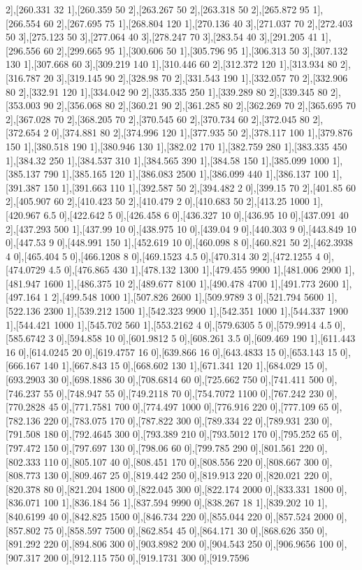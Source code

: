 {2],[260.331 32 1],[260.359 50 2],[263.267 50 2],[263.318 50 2],[265.872 95 1],[266.554 60 2],[267.695 75 1],[268.804 120 1],[270.136 40 3],[271.037 70 2],[272.403 50 3],[275.123 50 3],[277.064 40 3],[278.247 70 3],[283.54 40 3],[291.205 41 1],[296.556 60 2],[299.665 95 1],[300.606 50 1],[305.796 95 1],[306.313 50 3],[307.132 130 1],[307.668 60 3],[309.219 140 1],[310.446 60 2],[312.372 120 1],[313.934 80 2],[316.787 20 3],[319.145 90 2],[328.98 70 2],[331.543 190 1],[332.057 70 2],[332.906 80 2],[332.91 120 1],[334.042 90 2],[335.335 250 1],[339.289 80 2],[339.345 80 2],[353.003 90 2],[356.068 80 2],[360.21 90 2],[361.285 80 2],[362.269 70 2],[365.695 70 2],[367.028 70 2],[368.205 70 2],[370.545 60 2],[370.734 60 2],[372.045 80 2],[372.654 2 0],[374.881 80 2],[374.996 120 1],[377.935 50 2],[378.117 100 1],[379.876 150 1],[380.518 190 1],[380.946 130 1],[382.02 170 1],[382.759 280 1],[383.335 450 1],[384.32 250 1],[384.537 310 1],[384.565 390 1],[384.58 150 1],[385.099 1000 1],[385.137 790 1],[385.165 120 1],[386.083 2500 1],[386.099 440 1],[386.137 100 1],[391.387 150 1],[391.663 110 1],[392.587 50 2],[394.482 2 0],[399.15 70 2],[401.85 60 2],[405.907 60 2],[410.423 50 2],[410.479 2 0],[410.683 50 2],[413.25 1000 1],[420.967 6.5 0],[422.642 5 0],[426.458 6 0],[436.327 10 0],[436.95 10 0],[437.091 40 2],[437.293 500 1],[437.99 10 0],[438.975 10 0],[439.04 9 0],[440.303 9 0],[443.849 10 0],[447.53 9 0],[448.991 150 1],[452.619 10 0],[460.098 8 0],[460.821 50 2],[462.3938 4 0],[465.404 5 0],[466.1208 8 0],[469.1523 4.5 0],[470.314 30 2],[472.1255 4 0],[474.0729 4.5 0],[476.865 430 1],[478.132 1300 1],[479.455 9900 1],[481.006 2900 1],[481.947 1600 1],[486.375 10 2],[489.677 8100 1],[490.478 4700 1],[491.773 2600 1],[497.164 1 2],[499.548 1000 1],[507.826 2600 1],[509.9789 3 0],[521.794 5600 1],[522.136 2300 1],[539.212 1500 1],[542.323 9900 1],[542.351 1000 1],[544.337 1900 1],[544.421 1000 1],[545.702 560 1],[553.2162 4 0],[579.6305 5 0],[579.9914 4.5 0],[585.6742 3 0],[594.858 10 0],[601.9812 5 0],[608.261 3.5 0],[609.469 190 1],[611.443 16 0],[614.0245 20 0],[619.4757 16 0],[639.866 16 0],[643.4833 15 0],[653.143 15 0],[666.167 140 1],[667.843 15 0],[668.602 130 1],[671.341 120 1],[684.029 15 0],[693.2903 30 0],[698.1886 30 0],[708.6814 60 0],[725.662 750 0],[741.411 500 0],[746.237 55 0],[748.947 55 0],[749.2118 70 0],[754.7072 1100 0],[767.242 230 0],[770.2828 45 0],[771.7581 700 0],[774.497 1000 0],[776.916 220 0],[777.109 65 0],[782.136 220 0],[783.075 170 0],[787.822 300 0],[789.334 22 0],[789.931 230 0],[791.508 180 0],[792.4645 300 0],[793.389 210 0],[793.5012 170 0],[795.252 65 0],[797.472 150 0],[797.697 130 0],[798.06 60 0],[799.785 290 0],[801.561 220 0],[802.333 110 0],[805.107 40 0],[808.451 170 0],[808.556 220 0],[808.667 300 0],[808.773 130 0],[809.467 25 0],[819.442 250 0],[819.913 220 0],[820.021 220 0],[820.378 80 0],[821.204 1800 0],[822.045 300 0],[822.174 2000 0],[833.331 1800 0],[836.071 100 1],[836.184 56 1],[837.594 9990 0],[838.267 18 1],[839.202 10 1],[840.6199 40 0],[842.825 1500 0],[846.734 220 0],[855.044 220 0],[857.524 2000 0],[857.802 75 0],[858.597 7500 0],[862.854 45 0],[864.171 30 0],[868.626 350 0],[891.292 220 0],[894.806 300 0],[903.8982 200 0],[904.543 250 0],[906.9656 100 0],[907.317 200 0],[912.115 750 0],[919.1731 300 0],[919.7596 }
